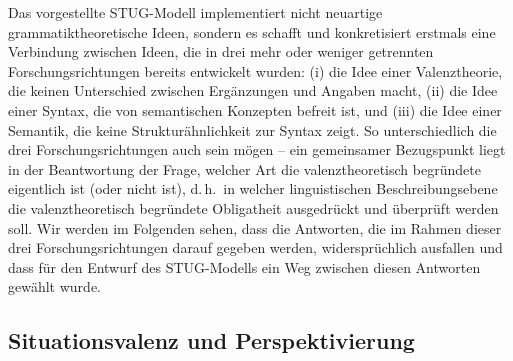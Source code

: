 Das vorgestellte STUG-Modell implementiert nicht neuartige grammatiktheoretische Ideen, sondern es schafft und konkretisiert erstmals eine Verbindung zwischen Ideen, die in drei mehr oder weniger getrennten Forschungsrichtungen bereits entwickelt wurden: (i) die Idee einer Valenztheorie, die keinen Unterschied zwischen Ergänzungen und Angaben macht, (ii) die Idee einer Syntax, die von semantischen Konzepten befreit ist, und (iii) die Idee einer Semantik, die keine Strukturähnlichkeit zur Syntax zeigt. So unterschiedlich die drei Forschungsrichtungen auch sein mögen -- ein gemeinsamer Bezugspunkt liegt  in der Beantwortung der Frage, welcher Art die valenztheoretisch begründete  eigentlich ist (oder nicht ist), d.\,h.\ in welcher linguistischen Beschreibungsebene die valenztheoretisch begründete Obligatheit ausgedrückt und überprüft werden soll. Wir werden im Folgenden sehen, dass die Antworten, die im Rahmen dieser drei Forschungsrichtungen darauf gegeben werden, widersprüchlich ausfallen und dass für den Entwurf des STUG-Modells ein Weg zwischen diesen Antworten gewählt wurde.

\subsection{Situationsvalenz und Perspektivierung} \label{sec-stug-valenz}\label{sec-situationsvalenz}

